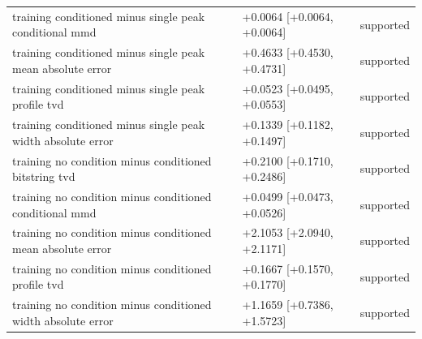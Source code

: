 \begin{table}[p]
\begin{tabular}{@{}p{}p{}p{}@{}}
training conditioned minus single peak conditional mmd & +0.0064 [+0.0064, +0.0064] & supported \\
training conditioned minus single peak mean absolute error & +0.4633 [+0.4530, +0.4731] & supported \\
training conditioned minus single peak profile tvd & +0.0523 [+0.0495, +0.0553] & supported \\
training conditioned minus single peak width absolute error & +0.1339 [+0.1182, +0.1497] & supported \\
training no condition minus conditioned bitstring tvd & +0.2100 [+0.1710, +0.2486] & supported \\
training no condition minus conditioned conditional mmd & +0.0499 [+0.0473, +0.0526] & supported \\
training no condition minus conditioned mean absolute error & +2.1053 [+2.0940, +2.1171] & supported \\
training no condition minus conditioned profile tvd & +0.1667 [+0.1570, +0.1770] & supported \\
training no condition minus conditioned width absolute error & +1.1659 [+0.7386, +1.5723] & supported \\
\bottomrule
\end{tabular}
\end{table}
\clearpage
